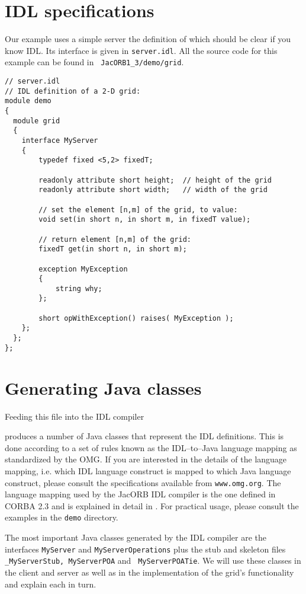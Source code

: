 \documentclass[12pt]{scrbook}
\begin{document}
\section{IDL specifications}

Our example uses a simple server the definition of which should be
clear if you know IDL. Its interface is given in {\tt server.idl}. All
the source code for this example can be found in {\tt
  JacORB1\_3/demo/grid}.

\small{
\begin{verbatim}
// server.idl
// IDL definition of a 2-D grid:
module demo
{
  module grid 
  { 
    interface MyServer
    {
        typedef fixed <5,2> fixedT;

        readonly attribute short height;  // height of the grid
        readonly attribute short width;   // width of the grid

        // set the element [n,m] of the grid, to value:
        void set(in short n, in short m, in fixedT value);

        // return element [n,m] of the grid:
        fixedT get(in short n, in short m);
        
        exception MyException
        {
            string why;
        };

        short opWithException() raises( MyException );
    };
  };
};
\end{verbatim}
}

\section{Generating Java classes}

Feeding this file into the IDL compiler 


produces a number of Java  classes that represent the IDL definitions.
This is  done according to a  set of rules known  as the IDL--to--Java
language mapping as standardized by  the OMG. If you are interested in
the details of the language mapping, i.e. which IDL language construct
is  mapped  to  which  Java  language construct,  please  consult  the
specifications available from  {\tt www.omg.org}. The language mapping
used by the JacORB IDL compiler is the one defined in CORBA 2.3 and is
explained in detail in  \cite{Brose2001a}. For practical usage, please
consult the examples in the {\tt demo} directory.

The most important Java classes  generated by the IDL compiler are the
interfaces {\tt  MyServer} and {\tt MyServerOperations}  plus the stub
and  skeleton   files  {\tt  \_MyServerStub,   MyServerPOA}  and  {\tt
MyServerPOATie}.  We will  use these classes in the  client and server
as  well as  in the  implementation  of the  grid's functionality  and
explain each in turn.
\end{document}
